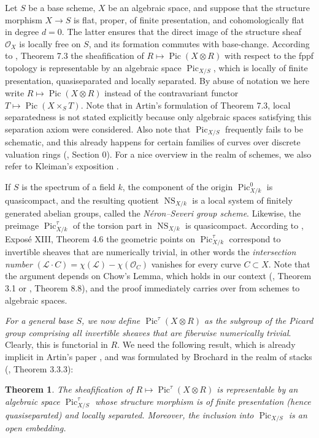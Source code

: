 \documentclass[oneside, 12pt]{amsart}
\newcommand\mylabel[1]{\label{#1}\marginpar{\raggedright\vspace{-1ex}\medskip\medskip\footnotesize \tt #1}}
\renewcommand\mylabel[1]{\label{#1}}
\newtheorem{theorem}{Theorem}[section]
\theoremstyle{definition}
\theoremstyle{remark}
\newcommand{\shL}{\mathscr{L}}
\newcommand{\NS}{\operatorname{NS}}
\renewcommand{\O}{\mathscr{O}}
\newcommand{\Pic}{\operatorname{Pic}}
\newcommand{\ra}{\rightarrow}
\begin{document}
Let $S$ be a base scheme, $X$ be an algebraic space, and suppose that the structure morphism $ X\ra S$   is flat, proper, of finite presentation,
and cohomologically flat in degree $d=0$.
The latter ensures that the direct image of the structure sheaf $\O_X$ is locally free on $S$, and its formation  commutes with     base-change.
According to \cite{Artin 1969},  Theorem 7.3 the sheafification of $R\mapsto\Pic(X\otimes R)$
with respect to the fppf topology 
is representable by an algebraic space $\Pic_{X/S}$, which is locally of finite presentation,  quasiseparated and locally separated. 
By abuse of notation 
we here write $R\mapsto\Pic(X\otimes R)$ instead of the contravariant functor $T\mapsto \Pic(X\times_ST)$.
Note that in Artin's formulation of Theorem 7.3,   local separatedness is not stated explicitly because   only
algebraic spaces satisfying this separation axiom were considered.
Also note that $\Pic_{X/S}$ frequently fails to be schematic, and this already happens for certain
families of curves over discrete valuation rings (\cite{FGA VI}, Section 0).
For a nice overview in the realm of schemes, we also refer to  Kleiman's exposition \cite{Kleiman 2005}.

If $S $ is the spectrum of a field $k$, the component of the origin $\Pic_{X/k}^0$
is quasicompact, and the resulting quotient $\NS_{X/k}$ is a local system of finitely generated abelian groups,
called the \emph{N\'eron--Severi group scheme}.
Likewise, the preimage $\Pic_{X/k}^\tau$ of the torsion part in  $\NS_{X/k}$
is quasicompact. According to \cite{SGA 6}, Expos\'e XIII,  Theorem 4.6  the geometric points on $\Pic^\tau_{X/k}$
correspond to invertible sheaves that are numerically trivial, in other words the \emph{intersection number}
$(\shL\cdot C)=\chi(\shL)-\chi(\O_C) $
vanishes for every   curve $C\subset X$.
Note that the argument depends on Chow's Lemma, which holds in our context (\cite{Knutson 1971}, Theorem 3.1 or \cite{Rydh 2015}, Theorem 8.8), 
and the proof immediately carries over from schemes to algebraic spaces.

\emph{For a general base $S$, we now define $\Pic^\tau(X\otimes R)$ as the subgroup of the Picard group comprising
all invertible sheaves   that are fiberwise numerically trivial}. 
Clearly, this is functorial in $R$. We need the following result, which is already implicit in Artin's paper \cite{Artin 1969},
and was formulated by Brochard in the realm of stacks (\cite{Brochard 2012}, Theorem 3.3.3):

\begin{theorem}
\mylabel{pic tau}
The sheafification of $R\mapsto \Pic^\tau(X\otimes R)$ is representable by an algebraic space $\Pic^\tau_{X/S}$
whose structure morphism is of finite presentation (hence quasiseparated) and locally separated. 
Moreover, the inclusion into $\Pic_{X/S}$ is an open embedding.
\end{theorem}
\end{document}
